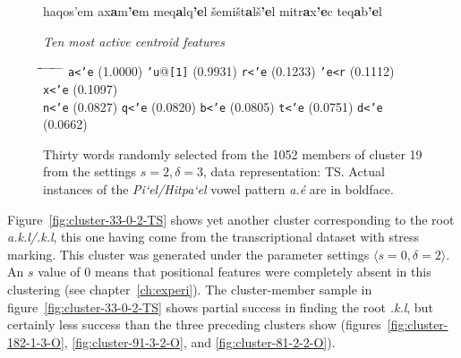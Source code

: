 \begin{figure}[htb]
\begin{mdframed}
\begin{normalsize}
\begin{tabbing}
haqos\a'{e}m \> ax\textbf{a}m\textbf{\a'{e}}m \> meq\textbf{a}lq\textbf{\a'{e}}l \> \v{s}emi\v{s}t\textbf{a}l\v{s}\textbf{\a'{e}}l \> mitr\textbf{a}x\textbf{\a'{e}}c \> teq\textbf{a}b\textbf{\a'{e}}l
\end{tabbing}
\end{normalsize}
\vspace{-3pt}
\begin{mdframed}
\begin{small}
\textit{Ten most active centroid features}
\vspace{-3pt}
\begin{tabbing}
\hspace*{7ex}\= \hspace*{12ex}\= \hspace*{7ex}\= \hspace*{12ex} \= \hspace*{7ex} \= \hspace*{12ex} \= \hspace*{6ex}\= \hspace*{12ex} \= \hspace*{6ex} \= \hspace*{10ex}\kill
\texttt{a<\a'{e}} \> (1.0000) \> \texttt{\a'{u}}@\texttt{[1]} \> (0.9931) \> \texttt{r<\a'{e}} \> (0.1233) \> \texttt{\a'{e}<r} \> (0.1112) \> \texttt{x<\a'{e}} \> (0.1097)\\
\texttt{n<\a'{e}} \> (0.0827) \> \texttt{q<\a'{e}} \> (0.0820) \> \texttt{b<\a'{e}} \> (0.0805) \> \texttt{t<\a'{e}} \> (0.0751) \> \texttt{d<\a'{e}} \> (0.0662)
\end{tabbing}
\end{small}
\end{mdframed}
\vspace{-3pt}
\caption{Thirty words randomly selected from the 1052 members of cluster 19 from the settings $s=2,\delta =3$, data representation: TS. Actual instances of the \textit{Pi`el/Hitpa`el} vowel pattern \textit{a.\'{e}} are in boldface.}
\label{fig:cluster-19-2-3-TS}
\end{mdframed}
\end{figure}
Figure~\ref{fig:cluster-33-0-2-TS} shows yet another cluster corresponding to the root \textit{a.k.l/}\textit{.k.l}, this one
having come from the transcriptional dataset with stress marking. This cluster was generated under the parameter settings $\langle s=0, \delta=2 \rangle$. An $s$ value of 0 means that positional features were completely absent in this clustering (see chapter~\ref{ch:experi}).
The cluster-member sample in figure~\ref{fig:cluster-33-0-2-TS} shows partial success in finding the root 
\textit{.k.l}, but certainly less success than the three preceding clusters show
(figures~\ref{fig:cluster-182-1-3-O}, \ref{fig:cluster-91-3-2-O},
and \ref{fig:cluster-81-2-2-O}). 

